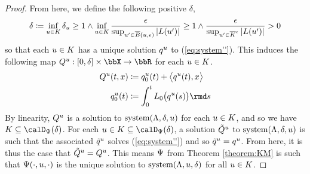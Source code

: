 \begin{proof}
  From here, we define the following positive $\delta$,
  \begin{equation*}
    \delta \coloneqq \inf_{u \in K} \delta_u \geq 1 \wedge \inf_{u\in K} \frac{\epsilon}{\sup_{u' \in \overline B(u,\epsilon)} |L(u')|} \geq 1 \wedge \frac{\epsilon}{\sup_{u' \in \overline K^\epsilon} |L(u')|} > 0
  \end{equation*}
  so that each $u \in K$ has a unique solution $q^u$ to (\ref{eq:system''}).
  This induces the following map $Q^\momentVar: [0,\delta] \times \stateSpace \rightarrow \bbR$ for each $u \in K$.
  \begin{align*}
    Q^\momentVar(t,\stateVar) &\defeq q^\momentVar_0(t) + \bprj{q^\momentVar(t)}{\stateVar} \\
    q_0^\momentVar(t) &\defeq \int_0^t \odePart_0\big(q^\momentVar(s)\big) \rmd s
  \end{align*}
  By linearity, $Q^u$ is a solution to $\operatorname{system}(\Lambda, \delta, u)$ for each $u \in K$, and so we have $K \subseteq \momentSpace(\delta)$.
  For each $\momentVar \in K \subseteq \momentSpace(\delta)$, a solution $\tilde Q^u$ to $\operatorname{system}(\Lambda,\delta,u)$ is such that the associated $\tilde q^u$ solves (\ref{eq:system''}) and so $\tilde q^u = q^u$.
  From here, it is thus the case that $\tilde Q^u = Q^u$.
  This means $\Psi$ from Theorem \ref{theorem:KM} is such that $\Psi(\cdot,u,\cdot)$ is the unique solution to $\operatorname{system}(\Lambda,u,\delta)$ for all $u \in K$.
\end{proof}
